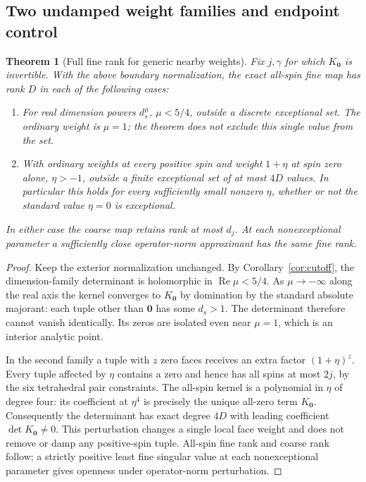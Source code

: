\documentclass[11pt]{article}
\newtheorem{theorem}{Theorem}
\theoremstyle{remark}
\begin{document}
\subsection{Two undamped weight families and endpoint control}
\begin{theorem}[Full fine rank for generic nearby weights]\label{thm:rank}
Fix \(j,\gamma\) for which \(K_{\boldsymbol 0}\) is invertible. With the above boundary normalization, the exact all-spin fine map has rank \(D\) in each of the following cases:
\begin{enumerate}
\item For real dimension powers \(d_s^\mu\), \(\mu<5/4\), outside a discrete exceptional set. The ordinary weight is \(\mu=1\); the theorem does not exclude this single value from the set.
\item With ordinary weights at every positive spin and weight \(1+\eta\) at spin zero alone, \(\eta>-1\), outside a finite exceptional set of at most \(4D\) values. In particular this holds for every sufficiently small nonzero \(\eta\), whether or not the standard value \(\eta=0\) is exceptional.
\end{enumerate}
In either case the coarse map retains rank at most \(d_j\). At each nonexceptional parameter a sufficiently close operator-norm approximant has the same fine rank.
\end{theorem}
\begin{proof}
Keep the exterior normalization unchanged. By Corollary~\ref{cor:cutoff}, the dimension-family determinant is holomorphic in \(\operatorname{Re}\mu<5/4\). As \(\mu\to-\infty\) along the real axis the kernel converges to \(K_{\boldsymbol 0}\) by domination by the standard absolute majorant: each tuple other than \(\boldsymbol 0\) has some \(d_s>1\). The determinant therefore cannot vanish identically. Its zeros are isolated even near \(\mu=1\), which is an interior analytic point.

In the second family a tuple with \(z\) zero faces receives an extra factor \((1+\eta)^z\). Every tuple affected by \(\eta\) contains a zero and hence has all spins at most \(2j\), by the six tetrahedral pair constraints. The all-spin kernel is a polynomial in \(\eta\) of degree four: its coefficient at \(\eta^4\) is precisely the unique all-zero term \(K_{\boldsymbol 0}\). Consequently the determinant has exact degree \(4D\) with leading coefficient \(\det K_{\boldsymbol 0}\ne0\). This perturbation changes a single local face weight and does not remove or damp any positive-spin tuple. All-spin fine rank and coarse rank follow; a strictly positive least fine singular value at each nonexceptional parameter gives openness under operator-norm perturbation.
\end{proof}
\end{document}
